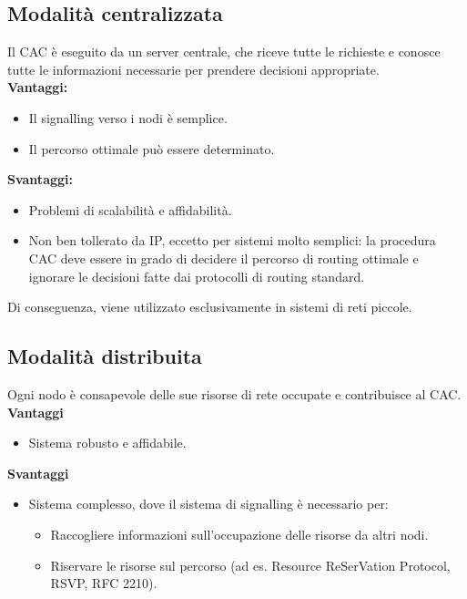 \subsection{Modalità centralizzata}
Il CAC è eseguito da un server centrale, che riceve tutte le richieste e conosce tutte le informazioni necessarie per prendere decisioni appropriate.
\\
\textbf{Vantaggi:}
\begin{itemize}
	\item Il signalling verso i nodi è semplice.
	\item Il percorso ottimale può essere determinato.
\end{itemize}
\textbf{Svantaggi:}
\begin{itemize}
	\item Problemi di scalabilità e affidabilità.
	\item Non ben tollerato da IP, eccetto per sistemi molto semplici: la procedura CAC deve essere in grado di decidere il percorso di routing ottimale e ignorare le decisioni fatte dai protocolli di routing standard.
\end{itemize}
Di conseguenza, viene utilizzato esclusivamente in sistemi di reti piccole.
\subsection{Modalità distribuita}
Ogni nodo è consapevole delle sue risorse di rete occupate e contribuisce al CAC.
\\
\textbf{Vantaggi}
\begin{itemize}
	\item Sistema robusto e affidabile.
\end{itemize}
\textbf{Svantaggi}
\begin{itemize}
	\item Sistema complesso, dove il sistema di signalling è necessario per:
	\begin{itemize}
		\item Raccogliere informazioni sull'occupazione delle risorse da altri nodi.
		\item Riservare le risorse sul percorso (ad es. Resource ReSerVation Protocol, RSVP, RFC 2210).
	\end{itemize}
\end{itemize}


